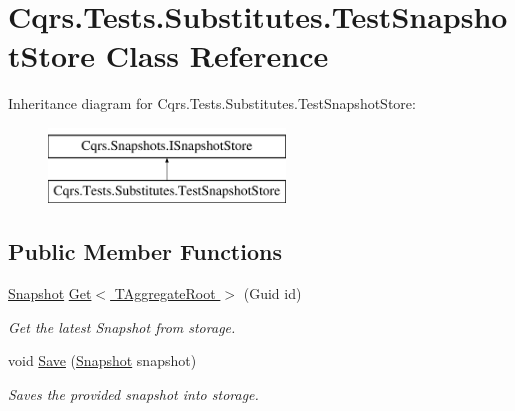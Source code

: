 \hypertarget{classCqrs_1_1Tests_1_1Substitutes_1_1TestSnapshotStore}{}\section{Cqrs.\+Tests.\+Substitutes.\+Test\+Snapshot\+Store Class Reference}
\label{classCqrs_1_1Tests_1_1Substitutes_1_1TestSnapshotStore}
Inheritance diagram for Cqrs.\+Tests.\+Substitutes.\+Test\+Snapshot\+Store\+:\begin{figure}[H]
\begin{center}
\leavevmode
\includegraphics[height=2.000000cm]{classCqrs_1_1Tests_1_1Substitutes_1_1TestSnapshotStore}
\end{center}
\end{figure}
\subsection*{Public Member Functions}
\begin{DoxyCompactItemize}
\item 
\hyperlink{classCqrs_1_1Snapshots_1_1Snapshot}{Snapshot} \hyperlink{classCqrs_1_1Tests_1_1Substitutes_1_1TestSnapshotStore_adc420bde9bd2e180a89a3a914e72691a_adc420bde9bd2e180a89a3a914e72691a}{Get$<$ T\+Aggregate\+Root $>$} (Guid id)
\begin{DoxyCompactList}\small\item\em Get the latest Snapshot from storage. \end{DoxyCompactList}\item 
void \hyperlink{classCqrs_1_1Tests_1_1Substitutes_1_1TestSnapshotStore_a223dbc9583120dec1469c1f84b863eae_a223dbc9583120dec1469c1f84b863eae}{Save} (\hyperlink{classCqrs_1_1Snapshots_1_1Snapshot}{Snapshot} snapshot)
\begin{DoxyCompactList}\small\item\em Saves the provided {\itshape snapshot}  into storage. \end{DoxyCompactList}\end{DoxyCompactItemize}

